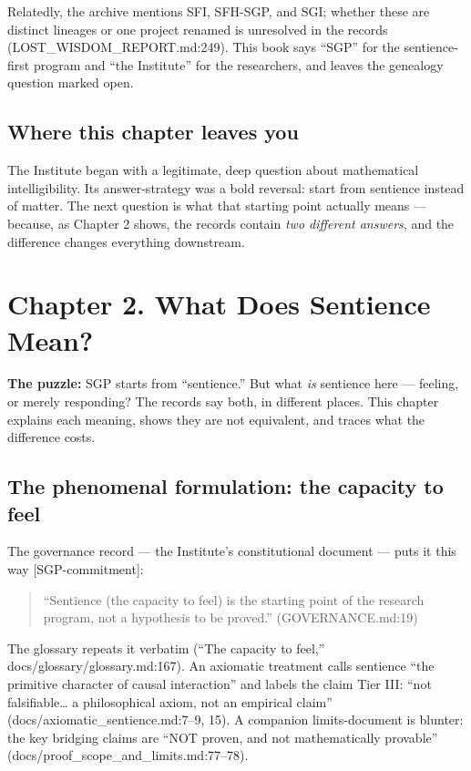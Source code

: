 \documentclass[
  11pt,
]{book}
\begin{document}
Relatedly, the archive mentions SFI, SFH-SGP, and SGI; whether these are
distinct lineages or one project renamed is unresolved in the records
(LOST\_WISDOM\_REPORT.md:249). This book says ``SGP'' for the
sentience-first program and ``the Institute'' for the researchers, and
leaves the genealogy question marked open.

\section{Where this chapter leaves
you}\label{where-this-chapter-leaves-you}

The Institute began with a legitimate, deep question about mathematical
intelligibility. Its answer-strategy was a bold reversal: start from
sentience instead of matter. The next question is what that starting
point actually means --- because, as Chapter 2 shows, the records
contain \emph{two different answers}, and the difference changes
everything downstream.

\newpage

\chapter{Chapter 2. What Does Sentience
Mean?}\label{chapter-2.-what-does-sentience-mean}

\textbf{The puzzle:} SGP starts from ``sentience.'' But what \emph{is}
sentience here --- feeling, or merely responding? The records say both,
in different places. This chapter explains each meaning, shows they are
not equivalent, and traces what the difference costs.

\section{The phenomenal formulation: the capacity to
feel}\label{the-phenomenal-formulation-the-capacity-to-feel}

The governance record --- the Institute's constitutional document ---
puts it this way {[}SGP-commitment{]}:

\begin{quote}
``Sentience (the capacity to feel) is the starting point of the research
program, not a hypothesis to be proved.'' (GOVERNANCE.md:19)
\end{quote}

The glossary repeats it verbatim (``The capacity to feel,''
docs/glossary/glossary.md:167). An axiomatic treatment calls sentience
``the primitive character of causal interaction'' and labels the claim
Tier III: ``not falsifiable\ldots{} a philosophical axiom, not an
empirical claim'' (docs/axiomatic\_sentience.md:7--9, 15). A companion
limits-document is blunter: the key bridging claims are ``NOT proven,
and not mathematically provable''
(docs/proof\_scope\_and\_limits.md:77--78).
\end{document}
